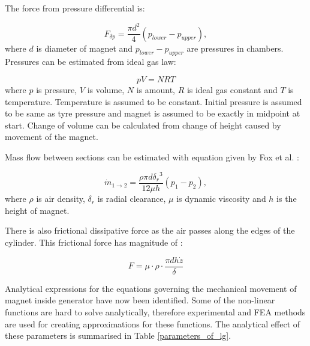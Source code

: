 The force from pressure differential is:

\begin{equation}
  F_{\delta p} = \frac{\pi d^2}{4}(p_{lower}-p_{upper}),
\end{equation}
where $d$ is diameter of magnet and $p_{lower}-p_{upper}$ are pressures in chambers. Pressures can be estimated from ideal gas law:

\begin{equation}
  pV = NRT
\end{equation}
where $p$ is pressure, $V$ is volume, $N$ is amount, $R$ is ideal gas constant and $T$ is temperature. Temperature is assumed to be constant. Initial pressure is assumed to be same as tyre pressure and magnet is assumed to be exactly in midpoint at start. Change of volume can be calculated from change of height caused by movement of the magnet. 

Mass flow between sections can be estimated with equation given by Fox et al. \cite{Fox2008}:

\begin{equation}
  \dot{m}_{1 \rightarrow 2} = \frac{\rho \pi d {\delta_r}^3}{12\mu h}(p_1-p_2),
\end{equation}
where $\rho$ is air density, $\delta_r$ is radial clearance, $\mu$ is dynamic viscosity and $h$ is the height of magnet. \cite{Tornincasa2012}

There is also frictional dissipative force as the air passes along the edges of the cylinder. This frictional force has magnitude of \cite{Medhat2008}: 

\begin{equation}
  F = \mu \cdot \rho \cdot \frac{\pi d h \dot{z}}{\delta}  
\end{equation}

Analytical expressions for the equations governing the mechanical movement of magnet inside generator have now been identified. Some of the non-linear functions are hard to solve analytically, therefore experimental and FEA methods are used for creating approximations for these functions. The analytical effect of these parameters is summarised in Table \ref{parameters_of_lg}.

